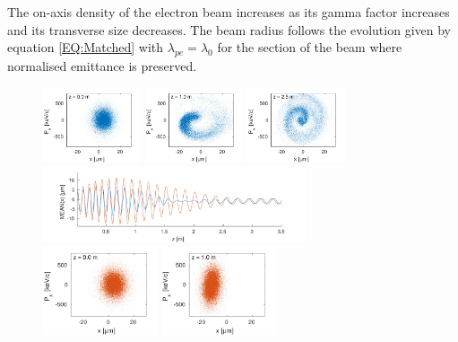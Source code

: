 \documentclass[aps,prstab,reprint,amsmath,amssymb,groupedaddress]{revtex4-1}
\begin{document}
The on-axis density of the electron beam increases as its gamma factor increases and its transverse size decreases. The
beam radius follows the evolution given by equation \ref{EQ:Matched} with $\lambda_{pe} = \lambda_{0}$ for the section
of the beam where normalised emittance is preserved.


\begin{figure}[hbt]
    \includegraphics[height=22.2mm,trim={ 0mm 9.5mm  6mm 0mm},clip]{figures/beamFilamentation01}
    \includegraphics[height=22.2mm,trim={16mm 9.5mm  6mm 0mm},clip]{figures/beamFilamentation02}
    \includegraphics[height=22.2mm,trim={16mm 9.5mm  0mm 0mm},clip]{figures/beamFilamentation03}
    \includegraphics[height=22.2mm,trim={10mm 9.5mm 15mm 0mm},clip]{figures/beamOffsetMean}
    \\
    \includegraphics[height=26.0mm,trim={ 0mm 0.1mm  6mm 2mm},clip]{figures/beamFilamentation04}
    \includegraphics[height=26.0mm,trim={16mm 0.1mm  6mm 2mm},clip]{figures/beamFilamentation05}

\end{figure}
\end{document}
